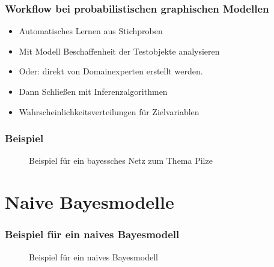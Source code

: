 \documentclass{beamer}
\begin{document}
\begin{frame}
  \frametitle{Workflow bei probabilistischen graphischen Modellen}
  \begin{itemize}
    \item Automatisches Lernen aus Stichproben 
    \item Mit Modell Beschaffenheit der Testobjekte analysieren
    \item Oder: direkt von Domainexperten erstellt werden. 
    \item Dann Schließen mit Inferenzalgorithmen
    \item Wahrscheinlichkeitsverteilungen für Zielvariablen
  \end{itemize}
\end{frame}

\begin{frame}
  \frametitle{Beispiel}
  \begin{figure}[htb]
  \caption{\label{fig:bayesnetwork}Beispiel für ein bayessches Netz zum Thema Pilze}
  \centering
  \end{figure}
\end{frame}

\section{Naive Bayesmodelle}
\frame{\tableofcontents[currentsection]}

\begin{frame}
  \frametitle{Beispiel für ein naives Bayesmodell}
  \begin{figure}[htb]
  \caption{\label{fig:nbgraph}Beispiel für ein naives Bayesmodell}
  \centering
  \end{figure}
\end{frame}
\end{document}
